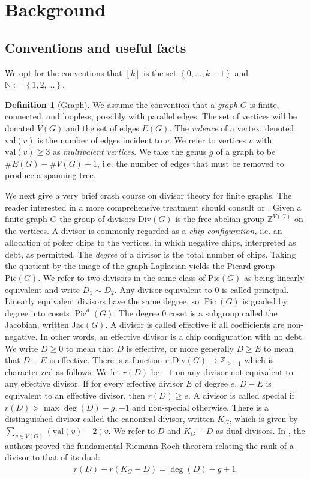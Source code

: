 \documentclass[11pt]{article}
\theoremstyle{definition}
\newtheorem{defi}[theo]{Definition}
\numberwithin{equation}{section}
\newcommand{\N}{\mathbb{N}}
\newcommand{\Z}{\mathbb{Z}}
\newcommand{\jac}[1]{\mathrm{Jac}\left({#1}\right)}
\newcommand{\opdiv}[1]{\mathrm{Div}\left({#1}\right)}
\newcommand{\pic}[1]{\mathrm{Pic}\left({#1}\right)}
\newcommand{\val}[1]{\mathrm{val}\left({#1}\right)}
\newcommand{\set}[1]{\left\{{#1}\right\}}
\newcommand{\Pic}{\operatorname{Pic}}
\begin{document}
\section{Background}
\label{sec:background}


\subsection{Conventions and useful facts}\label{ssec:conventions}
We opt for the conventions that $[k]$ is the set $\set{0,\dots,k-1}$ and $\N:=\set{1,2,\dots}$. 

\begin{defi}[Graph]\label{def-Graph}
We assume the convention that a \textit{graph} $G$ is finite, connected, and loopless, possibly with parallel edges. The set of vertices will be donated $V(G)$ and the set of edges $E(G)$. The \textit{valence} of a vertex, denoted $\val{v}$ is the number of edges incident to $v$. We refer to vertices $v$ with $\val{v} \geq 3$ as \emph{multivalent vertices}. We take the genus $g$ of a graph to be $\#E(G)- \#V(G)+1$, i.e. the number of edges that must be removed to produce a spanning tree.
\end{defi}

We next give a very brief crash course on divisor theory for finite graphs. The reader interested in a more comprehensive treatment should consult \cite{corry2018divisors} or \cite{jensenNotices}. Given a finite graph $G$ the group of divisors $\mathrm{Div}(G)$ is the free abelian group $\Z^{V(G)}$ on the vertices. 
A divisor is commonly regarded as a \emph{chip configuration,} i.e. an allocation of poker chips to the vertices, in which negative chips, interpreted as debt, as permitted. The \emph{degree} of a divisor is the total number of chips. 
Taking the quotient by the image of the graph Laplacian yields the Picard group $\pic{G}$. We refer to two divisors in the same class of $\pic{G}$ as being linearly equivalent and write $D_1 \sim D_2$. Any divisor equivalent to $0$ is called principal. 
Linearly equivalent divisors have the same degree, so $\Pic(G)$ is graded by degree into cosets $\Pic^d(G)$.
The degree $0$ coset is a subgroup called the Jacobian, written $\jac{G}$. A divisor is called effective if all coefficients are non-negative. In other words, an effective divisor is a chip configuration with no debt. We write $D \geq 0$ to mean that $D$ is effective, or more generally $D \geq E$ to mean that $D-E$ is effective. There is a function $r:\opdiv{G} \to \Z_{\geq -1}$ which is characterized as follows. We let $r(D)$ be $-1$ on any divisor not equivalent to any effective divisor. If for every effective divisor $E$ of degree $e$, $D-E$ is equivalent to an effective divisor, then $r(D) \geq e$. A divisor is called special if $r(D) > \max{\deg(D)-g, -1}$ and non-special otherwise. There is a distinguished divisor called the canonical divisor, written $K_G$, which is given by $\sum_{v \in V(G)}(\val{v}-2)v$. We refer to $D$ and $K_G-D$ as dual divisors. In \cite{BakNor07}, the authors proved the fundamental Riemann-Roch theorem relating the rank of a divisor to that of its dual:
\begin{align*}
    r(D) - r(K_G-D) = \deg(D)-g + 1.
\end{align*}
\end{document}
